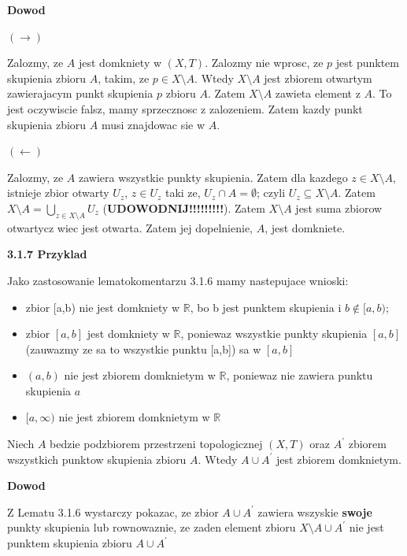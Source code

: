 \documentclass{article}
\begin{document}
\textbf{Dowod}

$(\rightarrow)$

Zalozmy, ze $A$ jest domkniety w $(X,T)$. Zalozmy nie wprosc, ze $p$ jest punktem skupienia zbioru $A$, takim, ze $p \in X\setminus A$. Wtedy $X\setminus A$ jest zbiorem otwartym zawierajacym punkt skupienia $p$ zbioru $A$. Zatem $X\setminus A$ zawieta element z $A$. To jest oczywiscie falsz, mamy sprzecznosc z zalozeniem. Zatem kazdy punkt skupienia zbioru $A$ musi znajdowac sie w $A$.

$(\leftarrow)$

Zalozmy, ze $A$ zawiera wszystkie punkty skupienia. Zatem dla kazdego $z \in X\setminus A$, istnieje zbior otwarty $U_{z}$, $z \in U_{z}$ taki ze, $U_{z} \cap A = \emptyset$; czyli $U_{z} \subseteq X\setminus A$. Zatem $X\setminus A = \bigcup\limits_{z \in X\setminus A}U_{z}$ (\textbf{UDOWODNIJ!!!!!!!!!}). Zatem $X\setminus A$ jest suma zbiorow otwartycz wiec jest otwarta. Zatem jej dopelnienie, $A$, jest domkniete. 

\textbf{3.1.7 Przyklad}

Jako zastosowanie lematokomentarzu 3.1.6 mamy nastepujace wnioski:
\begin{itemize}
    \item zbior [a,b) nie jest domkniety w $\mathbb{R}$, bo b jest punktem skupienia i $b \not\in [a,b)$;
    \item zbior $[a,b]$ jest domkniety w $\mathbb{R}$, poniewaz wszystkie punkty skupienia $[a,b]$(zauwazmy ze sa to wszystkie punktu [a,b]) sa w $[a,b]$
    \item $(a,b)$ nie jest zbiorem domknietym w $\mathbb{R}$, poniewaz nie zawiera punktu skupienia $a$
    \item $[a, \infty)$ nie jest zbiorem domknietym w $\mathbb{R}$  
\end{itemize}

\begin{tcolorbox}[colback=white!90!green,colframe=black!35!green,title=3.1.8 Lematokomentarz: domknietosc  $A \cup A^{\prime}$]

    Niech $A$ bedzie podzbiorem przestrzeni topologicznej $(X,T)$ oraz $A^{\prime}$ zbiorem wszystkich punktow skupienia zbioru $A$. Wtedy $A \cup A^{\prime}$ jest zbiorem domknietym.

\end{tcolorbox}

\textbf{Dowod}

Z Lematu 3.1.6 wystarczy pokazac, ze zbior $A \cup A^{\prime}$ zawiera wszyskie \textbf{swoje} punkty skupienia lub rownowaznie, ze zaden element zbioru $X \setminus A\cup A^{\prime}$ nie jest punktem skupienia zbioru $A\cup A^{\prime}$
\end{document}
